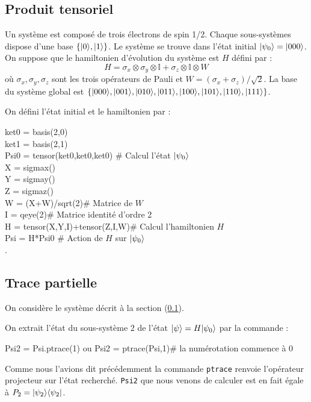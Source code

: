 \subsection{Produit tensoriel} \label{tensor}
Un système est composé de trois électrons de spin 1/2. Chaque sous-systèmes dispose d'une base $\{\vert0\rangle,\vert1\rangle\}$. Le système se trouve dans l'état initial $\vert\psi_0\rangle=\vert000\rangle$. On suppose que le hamiltonien d'évolution du système est $H$ défini par :
\begin{equation}
H = \sigma_x\otimes\sigma_y\otimes\mathbb{I}+\sigma_z\otimes\mathbb{I}\otimes W
\end{equation}
où $\sigma_x,\sigma_y,\sigma_z$ sont les trois opérateurs de Pauli et $W=(\sigma_x+\sigma_z)/\sqrt{2}$. La base du système global est $\{\vert000\rangle,\vert001\rangle,\vert010\rangle,\vert011\rangle,\vert100\rangle,\vert101\rangle,\vert110\rangle,\vert111\rangle\}$.

On défini l'état initial et le hamiltonien par :\\
\begin{tt}
ket0 = basis(2,0)\\
ket1 = basis(2,1)\\
Psi0 = tensor(ket0,ket0,ket0) \# Calcul l'état $\vert\psi_0\rangle$\\
X = sigmax()\\
Y = sigmay()\\
Z = sigmaz()\\
W = (X+W)/sqrt(2)\# Matrice de $W$\\
I = qeye(2)\# Matrice identité d'ordre 2\\
H = tensor(X,Y,I)+tensor(Z,I,W)\# Calcul l'hamiltonien $H$\\
Psi = H*Psi0 \# Action de $H$ sur $\vert\psi_0\rangle$\\.
\end{tt}


\subsection{Trace partielle}

On considère le système décrit à la section (\ref{tensor}).

On extrait l'état du sous-système 2 de l'état $\vert\psi\rangle=H\vert\psi_0\rangle$ par la commande :\\
\begin{tt}
Psi2 = Psi.ptrace(1) ou Psi2 = ptrace(Psi,1)\# la numérotation commence à 0\\
\end{tt}
Comme nous l'avions dit précédemment la commande \texttt{ptrace} renvoie l'opérateur projecteur sur l'état recherché. \texttt{Psi2} que nous venons de calculer est en fait égale à $P_2=\vert\psi_2\rangle\langle\psi_2\vert$.


